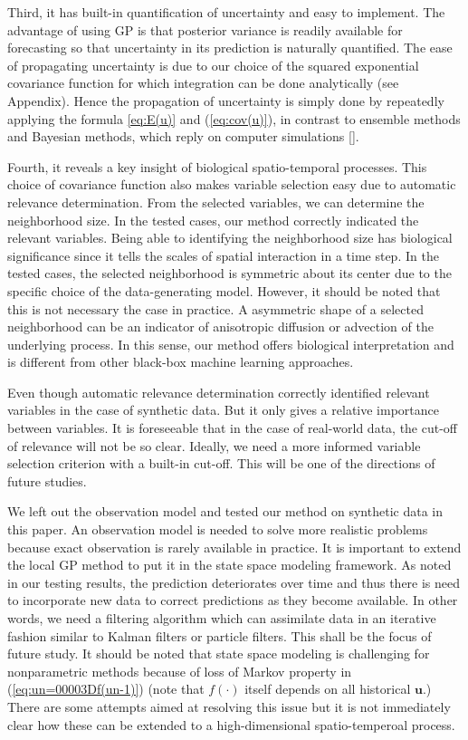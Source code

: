 \documentclass[11pt, reqno]{amsart}
\begin{document}
Third, it has built-in quantification of uncertainty and easy to implement. The advantage of using GP is that posterior variance is readily available for forecasting so that uncertainty in its prediction is naturally quantified. The ease of propagating uncertainty is due to our choice of the squared exponential covariance function for which integration can be done analytically (see Appendix). Hence the propagation of uncertainty is simply done by repeatedly applying the formula \ref{eq:E(u)} and (\ref{eq:cov(u)}), in contrast to ensemble methods and Bayesian methods, which reply on computer simulations [].   

Fourth, it reveals a key insight of biological spatio-temporal processes.  This choice of covariance function also makes variable selection easy due to automatic relevance determination. From the selected variables, we can determine the neighborhood size. In the tested cases, our method correctly indicated the relevant variables. Being able to identifying the neighborhood size has biological significance since it tells the scales of spatial interaction in a time step. In the tested cases, the selected neighborhood is symmetric about its center due to the specific choice of the data-generating model. However, it should be noted that this is not necessary the case in practice. A asymmetric shape of a selected neighborhood can be an indicator of anisotropic diffusion or advection of the underlying process. In this sense, our method offers biological interpretation and is different from other black-box machine learning approaches.        

Even though automatic relevance determination correctly identified relevant variables in the case of synthetic data. But it only gives a relative importance between variables. It is foreseeable that in the case of real-world data, the cut-off of relevance will not be so clear. Ideally, we need a more informed variable selection criterion with a built-in cut-off. This will be one of the directions of future studies. 

We left out the observation model and tested our method on synthetic data in this paper. An observation model is needed to solve more realistic problems because exact observation is rarely available in practice. It is important to extend the local GP method to put it in the state space modeling framework. As noted in our testing results, the prediction deteriorates over time and thus there is need to incorporate new data to correct predictions as they become available. In other words, we need a filtering algorithm which can assimilate data in an iterative fashion similar to Kalman filters or particle filters. This shall be the focus of future study. It should be noted that state space modeling is challenging for nonparametric methods because of loss of Markov property in (\ref{eq:un=00003Df(un-1)}) (note that $f(\cdot)$ itself depends on all historical $\mathbf{u}$.) There are some attempts aimed at resolving this issue \citep{frigola2013bayesian,Ghosh2014} but it is not immediately clear how these can be extended to a high-dimensional spatio-temperoal process. 
\end{document}
